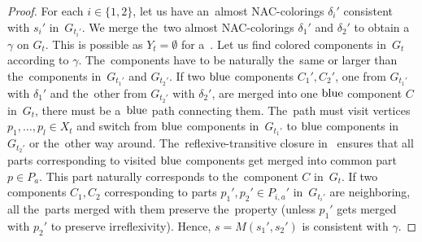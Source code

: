 %
\begin{proof}
	For each \( i \in \{1, 2\} \),
	let us have an~almost NAC-colorings \( \delta_i' \) consistent with
	\( s_i' \) in~\( G_{t_i'} \).
	We merge the~two almost NAC-colorings \( \delta_1' \) and \( \delta_2' \)
	to obtain a~\rbcol{} \( \gamma \) on \( G_t \).
	This is possible as \( Y_t = \emptyset \) for a~\JoinNode{}.
	Let us find colored components in~\( G_t \) according to \(	\gamma \).
	The~components have to be naturally the~same or larger
	than the~components in~\( G_{t_1'} \) and \( G_{t_2'} \).
	If two \( \text{blue} \) components \( C_1', C_2' \),
	one from \( G_{t_1'} \) with \( \delta_1' \) and
	the~other from \( G_{t_2'} \) with \( \delta_2' \),
	are merged into one \( \text{blue} \) component \( C \) in~\( G_t \),
	there must be a~\( \text{blue} \) path connecting them.
	The~path must visit vertices \( p_1, \dots, p_l \in X_t \)
	and switch from \( \text{blue} \) components in~\( G_{t_1'} \)
	to \( \text{blue} \) components in~\( G_{t_2'} \) or the~other way around.
	The~reflexive-transitive closure in~
	ensures that all parts corresponding to visited \( \text{blue} \) components
	get merged into common part \( p \in P_a \).
	This part naturally corresponds to the~component \( C \) in~\( G_t \).
	If two components \( C_1, C_2 \) corresponding to
	parts \( p_1', p_2' \in P_{i,a}' \) in~\( G_{t_i'} \) are neighboring,
	all the~parts merged with them preserve the~property
	(unless \( p_1' \) gets merged with \( p_2' \) to preserve irreflexivity).
	Hence, \( s = M(s_1', s_2') \) is consistent with \( \gamma \).
\end{proof}


